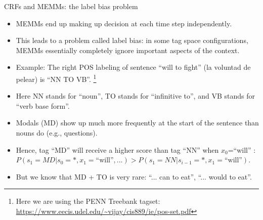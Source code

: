 \documentclass[handout]{beamer}
\begin{document}
\begin{frame}{CRFs and MEMMs: the label bias problem}
\begin{scriptsize}

\begin{itemize}

\item MEMMs end up making up decision at each time step independently.

\item This leads to a problem called label bias: in some tag space configurations, MEMMs essentially completely ignore important aspects of the context.

\item Example: The right POS labeling of sentence ``will to fight'' (la voluntad de pelear) is ``NN TO VB''. \footnote{Here we are using the PENN Treebank tagset: \url{https://www.eecis.udel.edu/~vijay/cis889/ie/pos-set.pdf}} 

\item Here NN stands for ``noun'', TO stands for ``infinitive to'',  and VB stands for ``verb base form''.

\item Modals (MD) show up much more frequently at the start of the sentence than nouns do (e.g., questions).

\item Hence, tag ``MD'' will receive a higher score than tag ``NN'' when $x_0$=``will'' : $P(s_1 = MD|s_{0} = *,x_1 = \text{``will''},...) > P( s_1 = NN| s_{i-1} = *, x_1 = \text{``will''})$.


\item But we know that MD + TO is very rare: ``... can to eat'', ``... would to eat''.



\end{itemize}

\end{scriptsize}
\end{frame}
\end{document}
